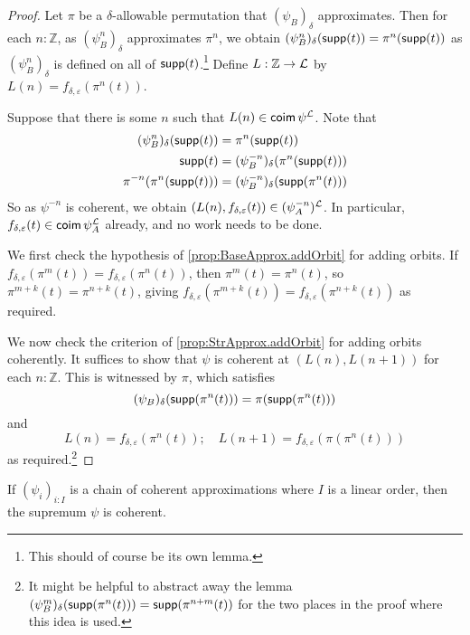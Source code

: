 \begin{proof}
  Let \( \pi \) be a \( \delta \)-allowable permutation that \( (\psi_B)_\delta \) approximates.
  Then for each \( n : \mathbb Z \), as \( (\psi^n_B)_\delta \) approximates \( \pi^n \), we obtain \( (\psi^n_B)_\delta(\operatorname{\mathsf{supp}}(t)) = \pi^n(\operatorname{\mathsf{supp}}(t)) \) as \( (\psi^n_B)_\delta \) is defined on all of \( \operatorname{\mathsf{supp}}(t) \).\footnote{This should of course be its own lemma.}
  Define \( L : \mathbb Z \to {\mathcal L} \) by \( L(n) = f_{\delta,\varepsilon}(\pi^n(t)) \).

  Suppose that there is some \( n \) such that \( L(n) \in \operatorname{\mathsf{coim}} \psi^{\mathcal L} \).
  Note that
  \begin{align*}
    (\psi^n_B)_\delta(\operatorname{\mathsf{supp}}(t)) &= \pi^n(\operatorname{\mathsf{supp}}(t)) \\
    \operatorname{\mathsf{supp}}(t) &= (\psi^{-n}_B)_\delta(\pi^n(\operatorname{\mathsf{supp}}(t))) \\
    \pi^{-n}(\pi^n(\operatorname{\mathsf{supp}}(t))) &= (\psi^{-n}_B)_\delta(\operatorname{\mathsf{supp}}(\pi^n(t)))
  \end{align*}
  So as \( \psi^{-n} \) is coherent, we obtain \( (L(n), f_{\delta,\varepsilon}(t)) \in (\psi^{-n}_A)^{\mathcal L} \).
  In particular, \( f_{\delta,\varepsilon}(t) \in \operatorname{\mathsf{coim}} \psi_A^{\mathcal L} \) already, and no work needs to be done.

  We first check the hypothesis of \cref{prop:BaseApprox.addOrbit} for adding orbits.
  If \( f_{\delta,\varepsilon}(\pi^m(t)) = f_{\delta,\varepsilon}(\pi^n(t)) \), then \( \pi^m(t) = \pi^n(t) \), so \( \pi^{m+k}(t) = \pi^{n+k}(t) \), giving \( f_{\delta,\varepsilon}(\pi^{m+k}(t)) = f_{\delta,\varepsilon}(\pi^{n+k}(t)) \) as required.

  We now check the criterion of \cref{prop:StrApprox.addOrbit} for adding orbits coherently.
  It suffices to show that \( \psi \) is coherent at \( (L(n), L(n+1)) \) for each \( n : \mathbb Z \).
  This is witnessed by \( \pi \), which satisfies
  \[ (\psi_B)_\delta(\operatorname{\mathsf{supp}}(\pi^n(t))) = \pi(\operatorname{\mathsf{supp}}(\pi^n(t))) \]
  and
  \[ L(n) = f_{\delta,\varepsilon}(\pi^n(t));\quad L(n+1) = f_{\delta,\varepsilon}(\pi(\pi^n(t))) \]
  as required.\footnote{It might be helpful to abstract away the lemma \( (\psi^m_B)_\delta(\operatorname{\mathsf{supp}}(\pi^n(t))) = \operatorname{\mathsf{supp}}(\pi^{n+m}(t)) \) for the two places in the proof where this idea is used.}
\end{proof}
\begin{proposition}
  \label{prop:StrApprox.chain}
  If \( (\psi_i)_{i : I} \) is a chain of coherent approximations where \( I \) is a linear order, then the supremum \( \psi \) is coherent.
\end{proposition}
